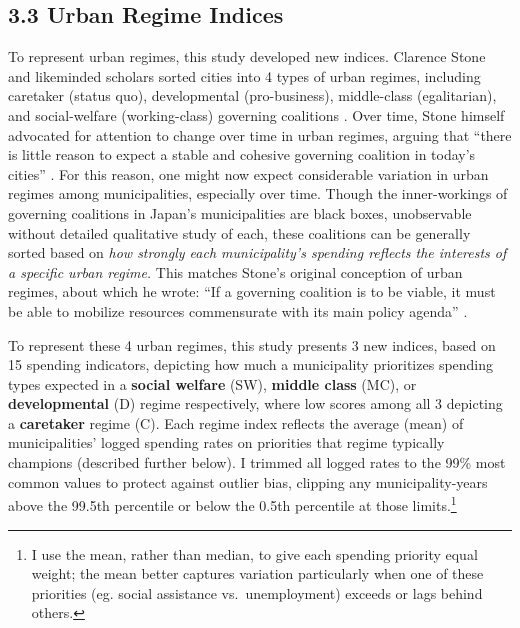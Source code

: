 \documentclass[preprint, 3p,
authoryear]{elsarticle} %
\begin{document}
\hypertarget{urban-regime-indices}{%
\subsection{3.3 Urban Regime Indices}\label{urban-regime-indices}}

To represent urban regimes, this study developed new indices. Clarence
Stone and likeminded scholars sorted cities into 4 types of urban
regimes, including caretaker (status quo), developmental (pro-business),
middle-class (egalitarian), and social-welfare (working-class) governing
coalitions
\citep{stone_1989, stoker_and_mossberger_1994, mossberger_and_stoker_2001, kilburn_2004, de_socio_2007}.
Over time, Stone himself advocated for attention to change over time in
urban regimes, arguing that ``there is little reason to expect a stable
and cohesive governing coalition in today's cities''
\citep{stone_et_al_2015}. For this reason, one might now expect
considerable variation in urban regimes among municipalities, especially
over time. Though the inner-workings of governing coalitions in Japan's
municipalities are black boxes, unobservable without detailed
qualitative study of each, these coalitions can be generally sorted
based on \emph{how strongly each municipality's spending reflects the
interests of a specific urban regime.} This matches Stone's original
conception of urban regimes, about which he wrote: ``If a governing
coalition is to be viable, it must be able to mobilize resources
commensurate with its main policy agenda'' \citep{stone_1993}.

To represent these 4 urban regimes, this study presents 3 new indices,
based on 15 spending indicators, depicting how much a municipality
prioritizes spending types expected in a \textbf{social welfare} (SW),
\textbf{middle class} (MC), or \textbf{developmental} (D) regime
respectively, where low scores among all 3 depicting a
\textbf{caretaker} regime (C). Each regime index reflects the average
(mean) of municipalities' logged spending rates on priorities that
regime typically champions (described further below). I trimmed all
logged rates to the 99\% most common values to protect against outlier
bias, clipping any municipality-years above the 99.5th percentile or
below the 0.5th percentile at those limits.\footnote{I use the mean,
  rather than median, to give each spending priority equal weight; the
  mean better captures variation particularly when one of these
  priorities (eg. social assistance vs.~unemployment) exceeds or lags
  behind others.}
\end{document}
